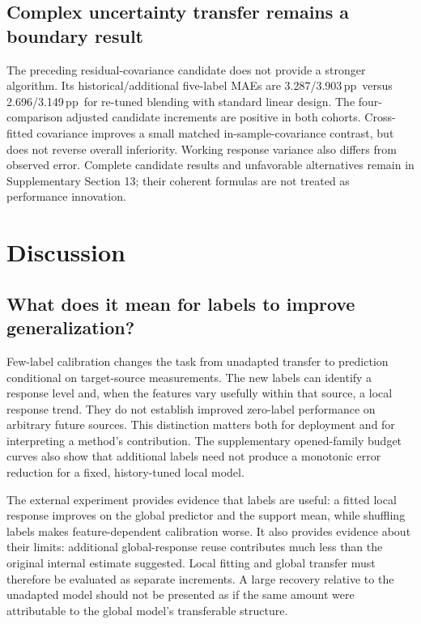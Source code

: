\documentclass[11pt]{article}
\newcommand{\pp}{\,pp}
\begin{document}
\subsection{Complex uncertainty transfer remains a boundary result}
The preceding residual-covariance candidate does not provide a stronger algorithm. Its historical/additional five-label MAEs are 3.287/3.903\pp\ versus 2.696/3.149\pp\ for re-tuned blending with standard linear design. The four-comparison adjusted candidate increments are positive in both cohorts. Cross-fitted covariance improves a small matched in-sample-covariance contrast, but does not reverse overall inferiority. Working response variance also differs from observed error. Complete candidate results and unfavorable alternatives remain in Supplementary Section 13; their coherent formulas are not treated as performance innovation.



\FloatBarrier

\section{Discussion}
\subsection{What does it mean for labels to improve generalization?}
Few-label calibration changes the task from unadapted transfer to prediction conditional on target-source measurements. The new labels can identify a response level and, when the features vary usefully within that source, a local response trend. They do not establish improved zero-label performance on arbitrary future sources. This distinction matters both for deployment and for interpreting a method's contribution. The supplementary opened-family budget curves also show that additional labels need not produce a monotonic error reduction for a fixed, history-tuned local model.

The external experiment provides evidence that labels are useful: a fitted local response improves on the global predictor and the support mean, while shuffling labels makes feature-dependent calibration worse. It also provides evidence about their limits: additional global-response reuse contributes much less than the original internal estimate suggested. Local fitting and global transfer must therefore be evaluated as separate increments. A large recovery relative to the unadapted model should not be presented as if the same amount were attributable to the global model's transferable structure.
\end{document}
